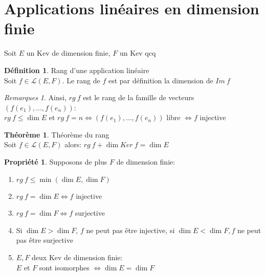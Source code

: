 \documentclass[fleqn]{article}
\theoremstyle{definition} \newtheorem*{defi}{D\'efinition}
\theoremstyle{definition} \newtheorem*{theo}{Th\'eor\`eme}
\theoremstyle{definition} \newtheorem*{coro}{Corollaire}
\theoremstyle{definition} \newtheorem*{nota}{Notation}
\theoremstyle{remark} \newtheorem*{rqs}{Remarques}
\theoremstyle{definition} \newtheorem*{prop}{Propri\'et\'e}
\begin{document}
\section{Applications lin\'eaires en dimension finie}
Soit $E$ un Kev de dimension finie, $F$ un Kev qcq
\begin{defi} Rang d'une application lin\'eaire \\
	Soit $f \in \mathscr{L}(E,F)$. Le rang de $f$ est par d\'efinition la dimension de $Im\ f$

	\begin{rqs}
		Ainsi, $rg\ f$ est le rang de la famille de vecteurs $(f(e_1), \hdots, f(e_n))$:\\
			$rg\ f \leq \dim E$ et $rg\ f = n \Leftrightarrow (f(e_1), \hdots, f(e_n))$ libre $\Leftrightarrow f$ injective
	\end{rqs}
\end{defi}

\begin{theo} Th\'eor\`eme du rang\\
	Soit $f \in \mathscr{L}(E,F)$ alors: $rg\ f + \dim Ker\ f = \dim E$
\end{theo}

\pagebreak
\begin{prop} Supposons de plus $F$ de dimension finie:
	\begin{enumerate}
		\item $rg\ f \leq \min(\dim E, \dim F)$
		\item $rg\ f = \dim E \Leftrightarrow f$ injective
		\item $rg\ f = \dim F \Leftrightarrow f$ surjective
		\item Si $\dim E > \dim F$, $f$ ne peut pas \^etre injective, si $\dim E < \dim F, f$ ne peut pas \^etre surjective
		\item $E,F$ deux Kev de dimension finie: \\ $E$ et $F$ sont isomorphes $\Leftrightarrow \dim E = \dim F$
	\end{enumerate}
\end{prop}
\end{document}
